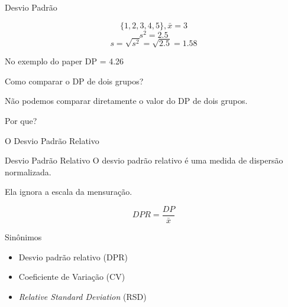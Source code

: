 \documentclass{beamer}
\begin{document}
\begin{frame}{Desvio Padrão}
  \begin{example}
      \begin{displaymath}
    \{1,2,3,4,5\}, \bar{x} = 3
  \end{displaymath}
      \begin{displaymath}
        s^2 = 2.5
      \end{displaymath}
    \begin{displaymath}
        s = \sqrt{s^2} = \sqrt{2.5} = 1.58
    \end{displaymath}
  \end{example}
  \begin{block}{No exemplo do paper}
    DP = 4.26
  \end{block}
\end{frame}

\begin{frame}{Como comparar o DP de dois grupos?}
  \begin{block}{}
    Não podemos comparar diretamente o \alert{valor} do DP de dois grupos.

    \bigskip
    Por que?
  \end{block}
\end{frame}

\begin{frame}{O Desvio Padrão Relativo}
  \begin{block}{Desvio Padrão Relativo}
    O desvio padrão relativo é uma medida de dispersão \alert{normalizada}.

    \bigskip
    Ela ignora a escala da mensuração.

    $$DPR = \frac{DP}{\bar{x}}$$
  \end{block}
  \begin{exampleblock}{Sinônimos}
    \begin{itemize}
    \item Desvio padrão relativo (DPR)
    \item Coeficiente de Variação (CV)
    \item {\em Relative Standard Deviation} (RSD)
  \end{itemize}
  \end{exampleblock}
\end{frame}
\end{document}
